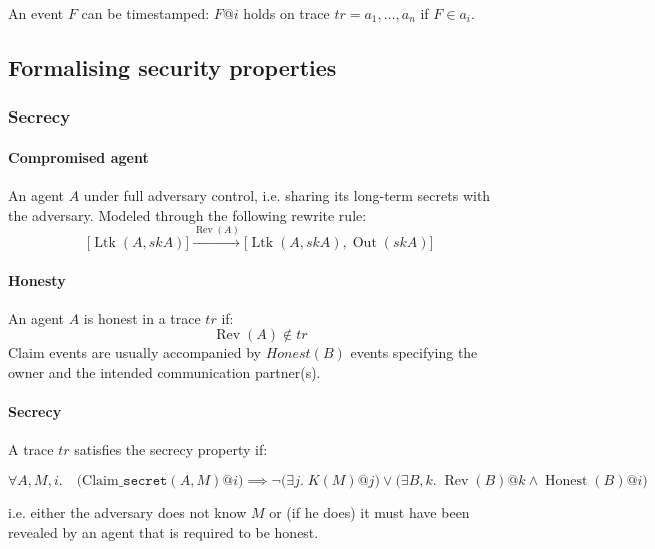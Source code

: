 An event $F$ can be timestamped: $F@i$ holds on trace $tr = a_1, \dots , a_n $ if $F \in a_i$.



\subsection{Formalising security properties}

\subsubsection{Secrecy}

\paragraph{Compromised agent} An agent $A$ under full adversary control, i.e. sharing its long-term secrets with the adversary. Modeled through the following rewrite rule:
$$ \big[ \operatorname{Ltk}(A, skA) \big] \xrightarrow{ \operatorname{Rev}(A)} \big[ \operatorname{Ltk}(A, skA), \operatorname{Out}(skA) \big] $$

\paragraph{Honesty} An agent $A$ is honest in a trace $tr$ if:
$$ \operatorname{Rev}(A) \notin tr$$
Claim events are usually accompanied by $Honest(B)$ events specifying the owner and the intended communication partner(s).

\paragraph{Secrecy} A trace $tr$ satisfies the secrecy property if:
\begin{tcolorbox}
$$
\forall A, M, i. \quad \big( \text{Claim\_}\texttt{secret}(A, M)@i \big) \implies \neg \big( \exists j. \; K(M)@j \big) \vee \Big( \exists B, k. \; \operatorname{Rev}(B)@k \wedge \operatorname{Honest}(B)@i \Big)
$$
\end{tcolorbox}
i.e. either the adversary does not know $M$ or (if he does) it must have been revealed by an agent that is required to be honest.

